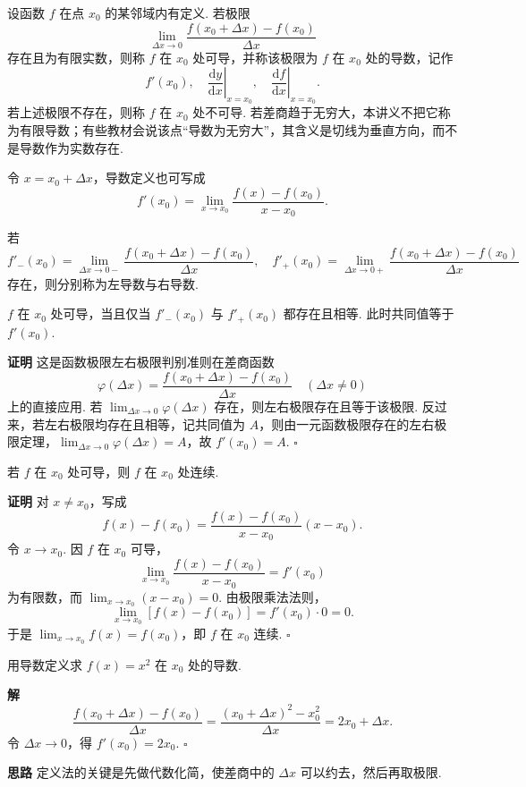 \documentclass[fontset=fandol]{ctexart}
\newenvironment{proofdetail}{\par\noindent\textbf{证明}\quad}{\hfill$\square$\par\vspace{0.8em}}
\newenvironment{solution}{\par\noindent\textbf{解}\quad}{\hfill$\square$\par\vspace{0.8em}}
\newenvironment{idea}{\par\noindent\textbf{思路}\quad}{\par\vspace{0.4em}}
\newcommand{\dd}{\mathrm{d}}
\begin{document}
\begin{definition}[导数]
设函数 $f$ 在点 $x_0$ 的某邻域内有定义. 若极限
\[
\lim_{\Delta x\to0}\frac{f(x_0+\Delta x)-f(x_0)}{\Delta x}
\]
存在且为有限实数，则称 $f$ 在 $x_0$ 处可导，并称该极限为 $f$ 在 $x_0$ 处的导数，记作
\[
f'(x_0),\quad \left.\frac{\dd y}{\dd x}\right|_{x=x_0},\quad \left.\frac{\dd f}{\dd x}\right|_{x=x_0}.
\]
若上述极限不存在，则称 $f$ 在 $x_0$ 处不可导. 若差商趋于无穷大，本讲义不把它称为有限导数；有些教材会说该点“导数为无穷大”，其含义是切线为垂直方向，而不是导数作为实数存在.
\end{definition}

令 $x=x_0+\Delta x$，导数定义也可写成
\[
f'(x_0)=\lim_{x\to x_0}\frac{f(x)-f(x_0)}{x-x_0}.
\]

\begin{definition}[左导数与右导数]
若
\[
f'_-(x_0)=\lim_{\Delta x\to0-}\frac{f(x_0+\Delta x)-f(x_0)}{\Delta x},\quad
f'_+(x_0)=\lim_{\Delta x\to0+}\frac{f(x_0+\Delta x)-f(x_0)}{\Delta x}
\]
存在，则分别称为左导数与右导数.
\end{definition}

\begin{proposition}[可导的充要条件]
$f$ 在 $x_0$ 处可导，当且仅当 $f'_-(x_0)$ 与 $f'_+(x_0)$ 都存在且相等. 此时共同值等于 $f'(x_0)$.
\end{proposition}
\begin{proofdetail}
这是函数极限左右极限判别准则在差商函数
\[
\varphi(\Delta x)=\frac{f(x_0+\Delta x)-f(x_0)}{\Delta x}\quad(\Delta x\neq0)
\]
上的直接应用. 若 $\lim_{\Delta x\to0}\varphi(\Delta x)$ 存在，则左右极限存在且等于该极限. 反过来，若左右极限均存在且相等，记共同值为 $A$，则由一元函数极限存在的左右极限定理，$\lim_{\Delta x\to0}\varphi(\Delta x)=A$，故 $f'(x_0)=A$.
\end{proofdetail}

\begin{theorem}[可导必连续]
若 $f$ 在 $x_0$ 处可导，则 $f$ 在 $x_0$ 处连续.
\end{theorem}
\begin{proofdetail}
对 $x\neq x_0$，写成
\[
f(x)-f(x_0)=\frac{f(x)-f(x_0)}{x-x_0}(x-x_0).
\]
令 $x\to x_0$. 因 $f$ 在 $x_0$ 可导，
\[
\lim_{x\to x_0}\frac{f(x)-f(x_0)}{x-x_0}=f'(x_0)
\]
为有限数，而 $\lim_{x\to x_0}(x-x_0)=0$. 由极限乘法法则，
\[
\lim_{x\to x_0}[f(x)-f(x_0)]=f'(x_0)\cdot0=0.
\]
于是 $\lim_{x\to x_0}f(x)=f(x_0)$，即 $f$ 在 $x_0$ 连续.
\end{proofdetail}

\begin{example}[用定义求导]
用导数定义求 $f(x)=x^2$ 在 $x_0$ 处的导数.
\end{example}
\begin{solution}
\[
\frac{f(x_0+\Delta x)-f(x_0)}{\Delta x}
=\frac{(x_0+\Delta x)^2-x_0^2}{\Delta x}
=2x_0+\Delta x.
\]
令 $\Delta x\to0$，得 $f'(x_0)=2x_0$.
\end{solution}
\begin{idea}
定义法的关键是先做代数化简，使差商中的 $\Delta x$ 可以约去，然后再取极限.
\end{idea}
\end{document}
